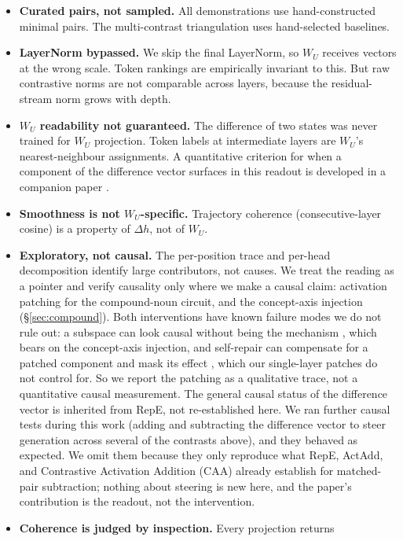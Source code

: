 \documentclass[11pt]{article}
\newcommand{\dhh}{\Delta h}
\newcommand{\WU}{W_U}
\begin{document}
\begin{itemize}[leftmargin=*]
\item \textbf{Curated pairs, not sampled.} All demonstrations use hand-constructed
  minimal pairs. The multi-contrast triangulation uses hand-selected
  baselines.
\item \textbf{LayerNorm bypassed.} We skip the final LayerNorm, so $\WU$ receives
  vectors at the wrong scale. Token rankings are empirically invariant to this.
  But raw contrastive norms are not comparable across layers, because the
  residual-stream norm grows with depth.
\item \textbf{$\WU$ readability not guaranteed.} The difference of two states was
  never trained for $\WU$ projection. Token labels at intermediate layers
  are $\WU$'s nearest-neighbour assignments. A quantitative criterion for
  when a component of the difference vector surfaces in this readout is
  developed in a companion paper \citep{tuomi2026visibility}.
\item \textbf{Smoothness is not $\WU$-specific.} Trajectory coherence
  (consecutive-layer cosine) is a property of $\dhh$, not of $\WU$.
\item \textbf{Exploratory, not causal.} The per-position trace and per-head
  decomposition identify large contributors, not causes. We treat the
  reading as a pointer and verify causality only where we make a causal
  claim: activation patching for the compound-noun circuit, and the concept-axis
  injection (\S\ref{sec:compound}). Both interventions have known failure modes we
  do not rule out: a subspace can look causal without being the mechanism
  \citep{makelov2023}, which bears on the concept-axis injection, and self-repair
  can compensate for a patched component and mask its effect \citep{mcgrath2023},
  which our single-layer patches do not control for. So we report the patching as
  a qualitative trace, not a quantitative causal measurement. The general
  causal status of the difference vector is inherited from RepE, not
  re-established here. We ran further causal tests during this work (adding and
  subtracting the difference vector to steer generation across several of the
  contrasts above), and they behaved as expected. We omit them because they only
  reproduce what RepE, ActAdd, and Contrastive Activation Addition (CAA) already establish for matched-pair
  subtraction; nothing about steering is new here, and the paper's contribution
  is the readout, not the intervention.
\item \textbf{Coherence is judged by inspection.} Every projection returns

\end{itemize}
\end{document}
